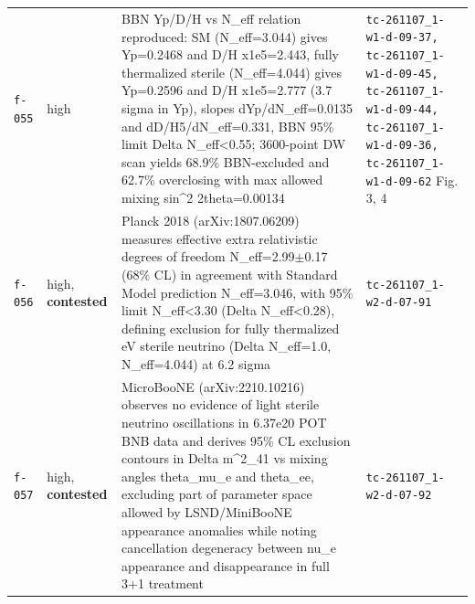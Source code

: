 \documentclass[11pt,a4paper]{article}
\begin{document}
\begin{longtable}{@{}p{}p{}p{}p{}@{}}
\texttt{f-055} & high & BBN Yp/D/H vs N\_eff relation reproduced: SM (N\_eff=3.044) gives Yp=0.2468 and D/H x1e5=2.443, fully thermalized sterile (N\_eff=4.044) gives Yp=0.2596 and D/H x1e5=2.777 (3.7 sigma in Yp), slopes dYp/dN\_eff=0.0135 and dD/H5/dN\_eff=0.331, BBN 95\% limit Delta N\_eff\textless{}0.55; 3600-point DW scan yields 68.9\% BBN-excluded and 62.7\% overclosing with max allowed mixing sin\textasciicircum{}2 2theta=0.00134 & \texttt{tc-261107\_\allowbreak{}1-w1-d-09-37,\allowbreak{} tc-261107\_\allowbreak{}1-w1-d-09-45,\allowbreak{} tc-261107\_\allowbreak{}1-w1-d-09-44,\allowbreak{} tc-261107\_\allowbreak{}1-w1-d-09-36,\allowbreak{} tc-261107\_\allowbreak{}1-w1-d-09-62} Fig. 3, 4 \\
\texttt{f-056} & high, \textbf{contested} & Planck 2018 (arXiv:1807.06209) measures effective extra relativistic degrees of freedom N\_eff=2.99$\pm$0.17 (68\% CL) in agreement with Standard Model prediction N\_eff=3.046, with 95\% limit N\_eff\textless{}3.30 (Delta N\_eff\textless{}0.28), defining exclusion for fully thermalized eV sterile neutrino (Delta N\_eff=1.0, N\_eff=4.044) at 6.2 sigma & \texttt{tc-261107\_\allowbreak{}1-w2-d-07-91} \\
\texttt{f-057} & high, \textbf{contested} & MicroBooNE (arXiv:2210.10216) observes no evidence of light sterile neutrino oscillations in 6.37e20 POT BNB data and derives 95\% CL exclusion contours in Delta m\textasciicircum{}2\_41 vs mixing angles theta\_mu\_e and theta\_ee, excluding part of parameter space allowed by LSND/MiniBooNE appearance anomalies while noting cancellation degeneracy between nu\_e appearance and disappearance in full 3+1 treatment & \texttt{tc-261107\_\allowbreak{}1-w2-d-07-92} \\
\bottomrule\end{longtable}
\end{document}
